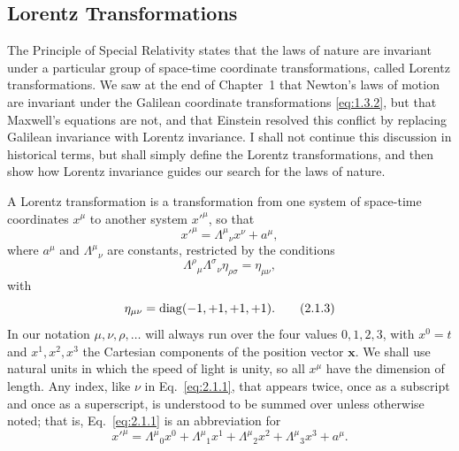 
\subsection{Lorentz Transformations}\label{sec:2.1}

The Principle of Special Relativity states that the laws of nature are invariant
under a particular group of space-time coordinate transformations, called
Lorentz transformations. We saw at the end of Chapter~1 that Newton's laws of
motion are invariant under the Galilean coordinate transformations
\eqref{eq:1.3.2}, but that Maxwell's equations are not, and that Einstein
resolved this conflict by replacing Galilean invariance with Lorentz invariance.
I shall not continue this discussion in historical terms, but shall simply define
the Lorentz transformations, and then show how Lorentz invariance guides our
search for the laws of nature.

A Lorentz transformation is a transformation from one system of space-time
coordinates \(x^\mu\) to another system \(x'^\mu\), so that
\begin{equation}
  x'^\mu=\Lambda^\mu{}_\nu x^\nu+a^\mu ,
  \tag{2.1.1}\label{eq:2.1.1}
\end{equation}
where \(a^\mu\) and \(\Lambda^\mu{}_\nu\) are constants, restricted by the
conditions
\begin{equation}
  \Lambda^\rho{}_\mu\Lambda^\sigma{}_\nu\eta_{\rho\sigma}
  =\eta_{\mu\nu},
  \tag{2.1.2}\label{eq:2.1.2}
\end{equation}
with
\begin{equation}
  \eta_{\mu\nu}=\operatorname{diag}(-1,+1,+1,+1).
  \tag{2.1.3}\label{eq:2.1.3}
\end{equation}
In our notation \(\mu,\nu,\rho,\ldots\) will always run over the four values
\(0,1,2,3\), with \(x^0=t\) and \(x^1,x^2,x^3\) the Cartesian components of
the position vector \(\mathbf{x}\). We shall use natural units in which the speed
of light is unity, so all \(x^\mu\) have the dimension of length. Any index, like
\(\nu\) in Eq.~\eqref{eq:2.1.1}, that appears twice, once as a subscript and once
as a superscript, is understood to be summed over unless otherwise noted; that
is, Eq.~\eqref{eq:2.1.1} is an abbreviation for
\[
  x'^\mu=\Lambda^\mu{}_0x^0+\Lambda^\mu{}_1x^1
  +\Lambda^\mu{}_2x^2+\Lambda^\mu{}_3x^3+a^\mu .
\]

